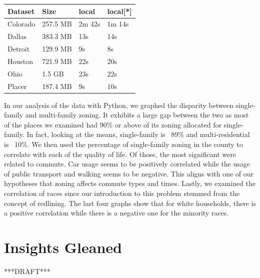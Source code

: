 \documentclass[titlepage]{article}
\begin{document}
\begin{table}[H]
  \centering
  \begin{tabular}{ |p{2cm}|p{2cm}|p{2cm}| p{2cm}| }
  \hline
    Dataset &Size &local &local[*]\\
    \hline
      Colorado & 257.5 MB &2m 42s &1m 14s \\
      Dallas & 383.3 MB &13s &14s \\
      Detroit &129.9 MB &9s &8s \\
      Houston &721.9 MB &22s &20s \\
      Ohio &1.5 GB &23s &22s \\
      Placer &187.4 MB &9s &10s \\
    \hline
  \end{tabular}
  \end{table}

In our analysis of the data with Python, we graphed the disparity between single-family and multi-family zoning. It exhibits a large gap between the two as most of the places we examined had 90\% or above of its zoning allocated for single-family. In fact, looking at the means, single-family is ~89\% and multi-residential is ~10\%. We then used the percentage of single-family zoning in the county to correlate with each of the quality of life. Of those, the most significant were related to commute. Car usage seems to be positively correlated while the usage of public transport and walking seems to be negative. This aligns with one of our hypotheses that zoning affects commute types and times. Lastly, we examined the correlation of races since our introduction to this problem stemmed from the concept of redlining. The last four graphs show that for white households, there is a positive correlation while there is a negative one for the minority races.

\section{Insights Gleaned}
***DRAFT***
\end{document}
